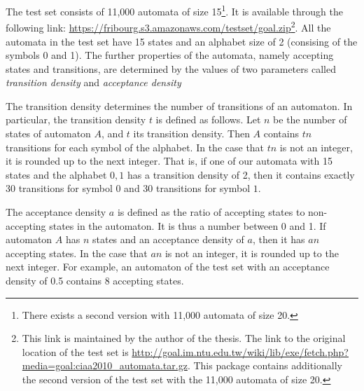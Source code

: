 The \goal{} test set consists of 11,000 automata of size 15\footnote{There exists a second version with 11,000 automata of size 20.}. It is available through the following link: \url{https://fribourg.s3.amazonaws.com/testset/goal.zip}\footnote{This link is maintained by the author of the thesis. The link to the original location of the  \goal{} test set is \url{http://goal.im.ntu.edu.tw/wiki/lib/exe/fetch.php?media=goal:ciaa2010_automata.tar.gz}. This package contains additionally the second version of the \goal{} test set with the 11,000 automata of size 20.}. All the automata in the test set have 15 states and an alphabet size of 2 (consising of the symbols 0 and 1). The further properties of the automata, namely accepting states and transitions, are determined by the values of two parameters called \textit{transition density} and \textit{acceptance density}

The transition density determines the number of transitions of an automaton. In particular, the transition density $t$ is defined as follows. Let $n$ be the number of states of automaton $A$, and $t$ its transition density. Then $A$ contains $tn$ transitions for each symbol of the alphabet. In the case that $tn$ is not an integer, it is rounded up to the next integer. That is, if one of our automata with 15 states and the alphabet ${0, 1}$ has a transition density of 2, then it contains exactly 30 transitions for symbol $0$ and 30 transitions for symbol $1$. %

The acceptance density $a$ is defined as the ratio of accepting states to non-accepting states in the automaton. It is thus a number between 0 and 1. If automaton $A$ has $n$ states and an acceptance density of $a$, then it has $an$ accepting states. In the case that $an$ is not an integer, it is rounded up to the next integer. For example, an automaton of the test set with an acceptance density of 0.5 contains 8 accepting states. %

